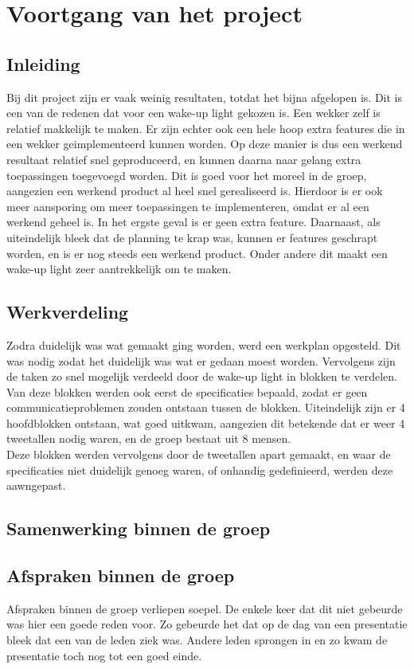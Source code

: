 \chapter{Voortgang van het project}

\section{Inleiding}
Bij dit project zijn er vaak weinig resultaten, totdat het bijna afgelopen is. 
Dit is een van de redenen dat voor een wake-up light gekozen is.
Een wekker zelf is relatief makkelijk te maken. 
Er zijn echter ook een hele hoop extra features die in een wekker geimplementeerd kunnen worden. 
Op deze manier is dus een werkend resultaat relatief snel geproduceerd, en kunnen daarna naar gelang extra toepassingen toegevoegd worden. 
Dit is goed voor het moreel in de groep, aangezien een werkend product al heel snel gerealiseerd is.
Hierdoor is er ook meer aansporing om meer toepassingen te implementeren, omdat er al een werkend geheel is. 
In het ergste geval is er geen extra feature.
Daarnaast, als uiteindelijk bleek dat de planning te krap was, kunnen er features geschrapt worden, en is er nog steeds een werkend product. 
Onder andere dit maakt een wake-up light zeer aantrekkelijk om te maken.

\section{Werkverdeling}
Zodra duidelijk was wat gemaakt ging worden, werd een werkplan opgesteld.
Dit was nodig zodat het duidelijk was wat er gedaan moest worden.
Vervolgens zijn de taken zo snel mogelijk verdeeld door de wake-up light in blokken te verdelen. 
Van deze blokken werden ook eerst de specificaties bepaald, zodat er geen communicatieproblemen zouden ontstaan tussen de blokken.
Uiteindelijk zijn er 4 hoofdblokken ontstaan, wat goed uitkwam, aangezien dit betekende dat er weer 4 tweetallen nodig waren, en de groep bestaat uit 8 mensen. \\
Deze blokken werden vervolgens door de tweetallen apart gemaakt, en waar de specificaties niet duidelijk genoeg waren, of onhandig gedefinieerd, werden deze aawngepast. 


\section{Samenwerking binnen de groep}


\section{Afspraken binnen de groep}
Afspraken binnen de groep verliepen soepel. De enkele keer dat dit niet gebeurde was hier een goede reden voor. Zo gebeurde het dat op de dag van een presentatie bleek dat een van de leden ziek was. Andere leden sprongen in en zo kwam de presentatie toch nog tot een goed einde.